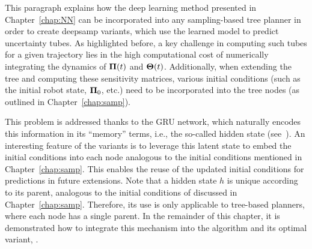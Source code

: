 This paragraph explains how the deep learning method presented in Chapter~\ref{chap:NN} can be incorporated into any sampling-based tree planner in order to create \gls{deepsamp} variants, which use the learned model to predict uncertainty tubes.
As highlighted before, a key challenge in computing such tubes for a given trajectory lies in the high computational cost of numerically integrating the dynamics of $\boldsymbol{\Pi}(t)$ and $\boldsymbol{\Theta}(t)$.
Additionally, when extending the tree and computing these sensitivity matrices, various initial conditions (such as the initial robot state, $\boldsymbol{\Pi}_0$, etc.) need to be incorporated into the tree nodes (as outlined in Chapter~\ref{chap:samp}).

This problem is addressed thanks to the GRU network, which naturally encodes this information in its ``memory'' terms, i.e., the so-called hidden state (see~\cite{cGRU}).
An interesting feature of the  variants is to leverage this latent state to embed the initial conditions into each node analogous to the  initial conditions mentioned in Chapter~\ref{chap:samp}. 
This enables the reuse of the updated initial conditions for predictions in future extensions.
Note that a hidden state $h$ is unique according to its parent, analogous to the initial conditions of  discussed in Chapter~\ref{chap:samp}.
Therefore, its use is only applicable to tree-based planners, where each node has a single parent.
In the remainder of this chapter, it is demonstrated how to integrate this mechanism into the  algorithm and its optimal variant, .





